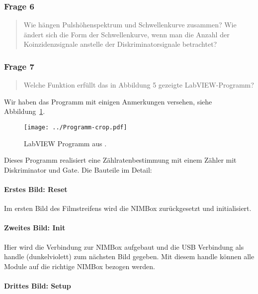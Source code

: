 \documentclass[11pt, ngerman, fleqn, DIV=15, headinclude, BCOR=2cm]{scrreprt}
\begin{document}
\subsubsection{Frage 6}

\begin{quote}
    Wie hängen Pulshöhenspektrum und Schwellenkurve zusammen? Wie ändert sich
    die Form der Schwellenkurve, wenn man die Anzahl der Koinzidenzsignale
    anstelle der Diskriminatorsignale betrachtet?
\end{quote}


\subsubsection{Frage 7}

\begin{quote}
    Welche Funktion erfüllt das in Abbildung 5 gezeigte LabVIEW-Programm?
\end{quote}

Wir haben das Programm mit einigen Anmerkungen versehen, siehe
Abbildung~\ref{fig:labview-test}.

\begin{figure}[htbp]
    \centering
    \texttt{[image: ../Programm-crop.pdf]}
    \caption{%
        LabVIEW Programm aus \parencite[Abbildung~5]{physik512-Anleitung}.
    }
    \label{fig:labview-test}
\end{figure}

Dieses Programm realisiert eine Zählratenbestimmung mit einem Zähler mit
Diskriminator und Gate. Die Bauteile im Detail:

\paragraph{Erstes Bild: Reset}

Im ersten Bild des Filmstreifens wird die NIMBox zurückgesetzt und
initialisiert.

\paragraph{Zweites Bild: Init}

Hier wird die Verbindung zur NIMBox aufgebaut und die USB Verbindung als handle
(dunkelviolett) zum nächsten Bild gegeben. Mit diesem handle können alle Module
auf die richtige NIMBox bezogen werden.

\paragraph{Drittes Bild: Setup}
\end{document}
